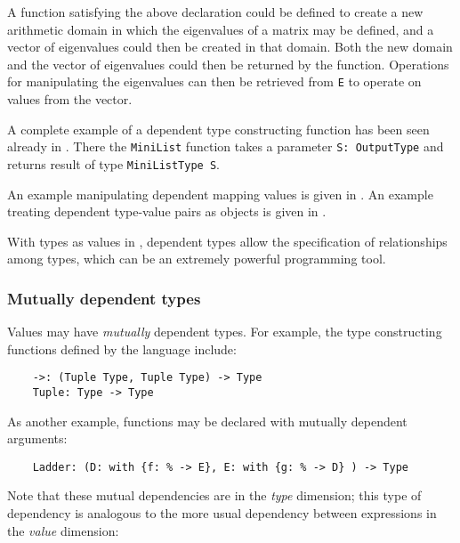 A function satisfying the above declaration could be defined to create
a new arithmetic domain in which the eigenvalues of a matrix may be defined,
and a vector of eigenvalues could then be created in that domain.
Both the new domain and the vector of eigenvalues could then be returned
by the function.
Operations for manipulating the eigenvalues can then be retrieved
from \verb"E" to operate on values from the vector.

A complete example of a dependent type constructing function has been seen
already in .  There the \verb"MiniList" function
takes a parameter \verb$S: OutputType$ and returns result of type
\verb"MiniListType S".

An example manipulating dependent mapping values is given
in . An example treating dependent
type-value pairs as objects is given in .

With types as values in \asharp{}, dependent types allow the
specification of relationships among types, which can be an
extremely powerful programming tool.

\subsubsection{Mutually dependent types}

Values may have {\em mutually\/} dependent types.
For example, the type constructing functions defined by the language include:

\begin{small}
\begin{verbatim}
    ->: (Tuple Type, Tuple Type) -> Type
    Tuple: Type -> Type
\end{verbatim}
\end{small}

As another example, functions may be declared with mutually dependent
arguments:

\begin{small}
\begin{verbatim}
    Ladder: (D: with {f: % -> E}, E: with {g: % -> D} ) -> Type
\end{verbatim}
\end{small}


Note that these mutual dependencies are in the {\em type\/} dimension;
this type of dependency is analogous to the more usual dependency
between expressions in the {\em value\/} dimension:

